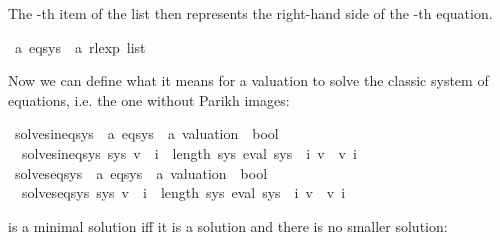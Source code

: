 \begin{isabellebody}
\begin{isamarkuptext}
The -th item of the list then represents the right-hand side  of the -th equation.%
\end{isamarkuptext}\isamarkuptrue%
\isamarkupfalse%
\ {\isacharprime}{\kern0pt}a\ eq{\isacharunderscore}{\kern0pt}sys\ {\isacharequal}{\kern0pt}\ {\isachardoublequoteopen}{\isacharprime}{\kern0pt}a\ rlexp\ list{\isachardoublequoteclose}%
\isadelimdocument
%
\endisadelimdocument
%
\isatagdocument
%
\isamarkuptrue%
%
\endisatagdocument
{\isafolddocument}%
%
\isadelimdocument
%
\endisadelimdocument
%
\begin{isamarkuptext}%
Now we can define what it means for a valuation  to solve the classic system of equations,
i.e. the one without Parikh images:%
\end{isamarkuptext}\isamarkuptrue%
\isamarkupfalse%
\ solves{\isacharunderscore}{\kern0pt}ineq{\isacharunderscore}{\kern0pt}sys\ {\isacharcolon}{\kern0pt}{\isacharcolon}{\kern0pt}\ {\isachardoublequoteopen}{\isacharprime}{\kern0pt}a\ eq{\isacharunderscore}{\kern0pt}sys\ {\isasymRightarrow}\ {\isacharprime}{\kern0pt}a\ valuation\ {\isasymRightarrow}\ bool{\isachardoublequoteclose}\ \isanewline
\ \ {\isachardoublequoteopen}solves{\isacharunderscore}{\kern0pt}ineq{\isacharunderscore}{\kern0pt}sys\ sys\ v\ {\isasymequiv}\ {\isasymforall}i\ {\isacharless}{\kern0pt}\ length\ sys{\isachardot}{\kern0pt}\ eval\ {\isacharparenleft}{\kern0pt}sys\ {\isacharbang}{\kern0pt}\ i{\isacharparenright}{\kern0pt}\ v\ {\isasymsubseteq}\ v\ i{\isachardoublequoteclose}\isanewline
\isanewline
\isanewline
{}\isamarkupfalse%
\ solves{\isacharunderscore}{\kern0pt}eq{\isacharunderscore}{\kern0pt}sys\ {\isacharcolon}{\kern0pt}{\isacharcolon}{\kern0pt}\ {\isachardoublequoteopen}{\isacharprime}{\kern0pt}a\ eq{\isacharunderscore}{\kern0pt}sys\ {\isasymRightarrow}\ {\isacharprime}{\kern0pt}a\ valuation\ {\isasymRightarrow}\ bool{\isachardoublequoteclose}\ \isanewline
\ \ {\isachardoublequoteopen}solves{\isacharunderscore}{\kern0pt}eq{\isacharunderscore}{\kern0pt}sys\ sys\ v\ {\isasymequiv}\ {\isasymforall}i\ {\isacharless}{\kern0pt}\ length\ sys{\isachardot}{\kern0pt}\ eval\ {\isacharparenleft}{\kern0pt}sys\ {\isacharbang}{\kern0pt}\ i{\isacharparenright}{\kern0pt}\ v\ {\isacharequal}{\kern0pt}\ v\ i{\isachardoublequoteclose}%
\begin{isamarkuptext}%
 is a minimal solution iff it is a solution and there is no smaller solution:%

\end{isamarkuptext}
\end{isabellebody}
